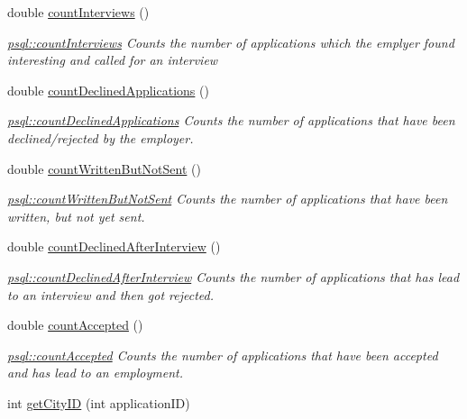 \begin{DoxyCompactItemize}
double \mbox{\hyperlink{classpsql_a84c1fdea2d09783a39677c4f79d924fc}{count\+Interviews}} ()
\begin{DoxyCompactList}\small\item\em \mbox{\hyperlink{classpsql_a84c1fdea2d09783a39677c4f79d924fc}{psql\+::count\+Interviews}} Counts the number of applications which the emplyer found interesting and called for an interview \end{DoxyCompactList}\item 
double \mbox{\hyperlink{classpsql_a40541367c3af9c0ac94e2fb92f00f53c}{count\+Declined\+Applications}} ()
\begin{DoxyCompactList}\small\item\em \mbox{\hyperlink{classpsql_a40541367c3af9c0ac94e2fb92f00f53c}{psql\+::count\+Declined\+Applications}} Counts the number of applications that have been declined/rejected by the employer. \end{DoxyCompactList}\item 
double \mbox{\hyperlink{classpsql_a70ad9f4b00735a55232f46da4edd2edc}{count\+Written\+But\+Not\+Sent}} ()
\begin{DoxyCompactList}\small\item\em \mbox{\hyperlink{classpsql_a70ad9f4b00735a55232f46da4edd2edc}{psql\+::count\+Written\+But\+Not\+Sent}} Counts the number of applications that have been written, but not yet sent. \end{DoxyCompactList}\item 
double \mbox{\hyperlink{classpsql_a2ae512bc231446d5fccae84582395675}{count\+Declined\+After\+Interview}} ()
\begin{DoxyCompactList}\small\item\em \mbox{\hyperlink{classpsql_a2ae512bc231446d5fccae84582395675}{psql\+::count\+Declined\+After\+Interview}} Counts the number of applications that has lead to an interview and then got rejected. \end{DoxyCompactList}\item 
double \mbox{\hyperlink{classpsql_a0beec2f098edc0961f27774cdd54d09b}{count\+Accepted}} ()
\begin{DoxyCompactList}\small\item\em \mbox{\hyperlink{classpsql_a0beec2f098edc0961f27774cdd54d09b}{psql\+::count\+Accepted}} Counts the number of applications that have been accepted and has lead to an employment. \end{DoxyCompactList}\item 
int \mbox{\hyperlink{classpsql_af3462a12dc106e0ca8df4fa8fcf28436}{get\+City\+ID}} (int application\+ID)

\end{DoxyCompactItemize}
